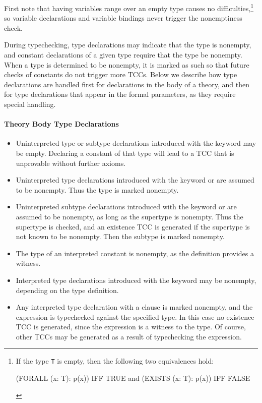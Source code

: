 First note that having variables range over an empty type causes no
difficulties,\footnote{If the type \texttt{T} is empty, then the following
two equivalences hold:
\begin{pvsex}
  (FORALL (x: T): p(x)) IFF TRUE \quad \mbox{\textrm{and}} \quad (EXISTS (x: T): p(x)) IFF FALSE
\end{pvsex}}
so variable declarations and variable bindings never trigger the
nonemptiness check.

During typechecking, type declarations may indicate that the type is
nonempty, and constant declarations of a given type require that the type
be nonempty.  When a type is determined to be nonempty, it is marked as
such so that future checks of constants do not trigger more TCCs.  Below
we describe how type declarations are handled first for declarations in the
body of a theory, and then for type declarations that appear in the formal
parameters, as they require special handling.

\paragraph{Theory Body Type Declarations}

\begin{itemize}

\item Uninterpreted type or subtype declarations introduced with the
keyword  may be empty.  Declaring a constant of that type
will lead to a TCC that is unprovable without further axioms.

\item Uninterpreted type declarations introduced with the keyword
or  are assumed to be nonempty.
Thus the type is marked nonempty.

\item Uninterpreted subtype declarations introduced with the keyword
 or  are assumed to be nonempty, as long as the
supertype is nonempty.  Thus the supertype is checked, and an existence
TCC is generated if the supertype is not known to be nonempty.  Then the
subtype is marked nonempty.

\item The type of an interpreted constant is nonempty, as the definition
provides a witness.

\item Interpreted type declarations introduced with the keyword
 may be non\-emp\-ty, depending on the type definition.

\item Any interpreted type declaration with a  clause
is marked nonempty, and the  expression is typechecked
against the specified type.  In this case no existence TCC is generated,
since the  expression is a witness to the type.  Of
course, other TCCs may be generated as a result of typechecking the
 expression.

\end{itemize}

